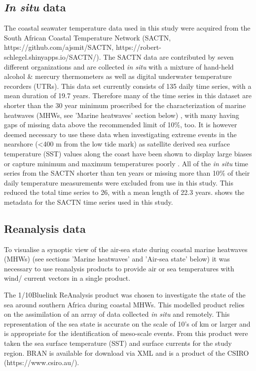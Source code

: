\documentclass[a4paper,10pt,review]{elsarticle}
\begin{document}
\subsection{\emph{In situ} data}
The coastal seawater temperature data used in this study were acquired from the South African Coastal Temperature Network (SACTN, https://github.com/ajsmit/SACTN, https://robert-schlegel.shinyapps.io/SACTN/). The SACTN data are contributed by seven different organizations and are collected \emph{in situ} with a mixture of hand-held alcohol \& mercury thermometers as well as digital underwater temperature recorders (UTRs). This data set currently consists of 135 daily time series, with a mean duration of 19.7 years. Therefore many of the time series in this dataset are shorter than the 30 year minimum proscribed for the characterization of marine heatwaves (MHWs, see 'Marine heatwaves' section below) \citep{Hobday2016}, with many having gaps of missing data above the recommended limit of 10\%, too. It is however deemed necessary to use these data when investigating extreme events in the nearshore (<400 m from the low tide mark) as satellite derived sea surface temperature (SST) values along the coast have been shown to display large biases \citep{Smit2013} or capture minimum and maximum temperatures poorly \citep{Smale2009, Castillo2010}. All of the \emph{in situ} time series from the SACTN shorter than ten years or missing more than 10\% of their daily temperature measurements were excluded from use in this study. This reduced the total time series to 26, with a mean length of 22.3 years.  shows the metadata for the SACTN time series used in this study.

\subsection{Reanalysis data}
To visualise a synoptic view of the air-sea state during coastal marine heatwaves (MHWs) (see sections 'Marine heatwaves' and 'Air-sea state' below) it was necessary to use reanalysis products to provide air or sea temperatures with wind/ current vectors in a single product.

The 1/10\degree Bluelink ReAnalysis product was chosen to investigate the state of the sea around southern Africa during coastal MHWs. This modelled product relies on the assimilation of an array of data collected \emph{in situ} and remotely. This representation of the sea state is accurate on the scale of 10's of km or larger and is appropriate for the identification of meso-scale events. From this product were taken the sea surface temperature (SST) and surface currents for the study region. BRAN is available for download via XML and is a product of the CSIRO (https://www.csiro.au/).
\end{document}
